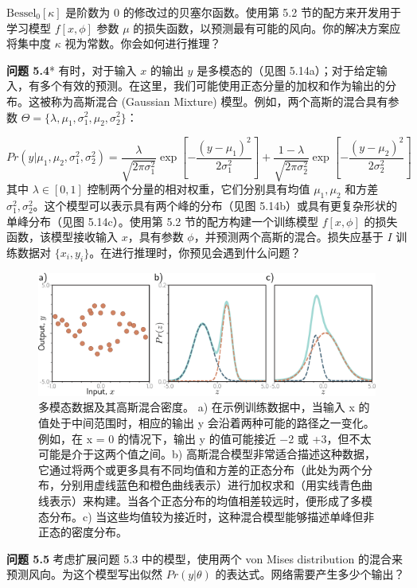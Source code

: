 \(\text{Bessel}_0[\kappa]\) 是阶数为 0 的修改过的贝塞尔函数。使用第 5.2 节的配方来开发用于学习模型 \(f[x, \phi]\) 参数 \(\mu\) 的损失函数，以预测最有可能的风向。你的解决方案应将集中度 \(\kappa\) 视为常数。你会如何进行推理？ 

\textbf{问题 5.4}* 有时，对于输入 \(x\) 的输出 \(y\) 是多模态的（见图 5.14a）；对于给定输入，有多个有效的预测。在这里，我们可能使用正态分量的加权和作为输出的分布。这被称为高斯混合 (Gaussian Mixture) 模型。例如，两个高斯的混合具有参数 \(\Theta = \{\lambda, \mu_1, \sigma_1^2, \mu_2, \sigma_2^2\}\)：

\begin{equation}
Pr(y|\mu_1, \mu_2, \sigma_1^2, \sigma_2^2) = \frac{\lambda}{\sqrt{2\pi\sigma_1^2}} \exp \left[ -\frac{(y - \mu_1)^2}{2\sigma_1^2} \right] + \frac{1 - \lambda}{\sqrt{2\pi\sigma_2^2}} \exp \left[ -\frac{(y - \mu_2)^2}{2\sigma_2^2} \right] 
\end{equation}
其中 \(\lambda \in [0, 1]\) 控制两个分量的相对权重，它们分别具有均值 \(\mu_1, \mu_2\) 和方差 \(\sigma_1^2, \sigma_2^2\)。这个模型可以表示具有两个峰的分布（见图 5.14b）或具有更复杂形状的单峰分布（见图 5.14c）。使用第 5.2 节的配方构建一个训练模型 \(f[x, \phi]\) 的损失函数，该模型接收输入 \(x\)，具有参数 \(\phi\)，并预测两个高斯的混合。损失应基于 \(I\) 训练数据对 \(\{x_i, y_i\}\)。在进行推理时，你预见会遇到什么问题？

\begin{figure}[ht!]
	\centering
	\includegraphics[width=0.7\linewidth]{png/chapter5/LossMoG.png}
	\caption{多模态数据及其高斯混合密度。 a) 在示例训练数据中，当输入 x 的值处于中间范围时，相应的输出 y 会沿着两种可能的路径之一变化。例如，在 x = 0 的情况下，输出 y 的值可能接近 −2 或 +3，但不太可能是介于这两个值之间。b) 高斯混合模型非常适合描述这种数据，它通过将两个或更多具有不同均值和方差的正态分布（此处为两个分布，分别用虚线蓝色和橙色曲线表示）进行加权求和（用实线青色曲线表示）来构建。当各个正态分布的均值相差较远时，便形成了多模态分布。c) 当这些均值较为接近时，这种混合模型能够描述单峰但非正态的密度分布。}
\end{figure}


\textbf{问题 5.5} 考虑扩展问题 5.3 中的模型，使用两个 von Mises distribution 的混合来预测风向。为这个模型写出似然 \(Pr(y|\theta)\) 的表达式。网络需要产生多少个输出？

